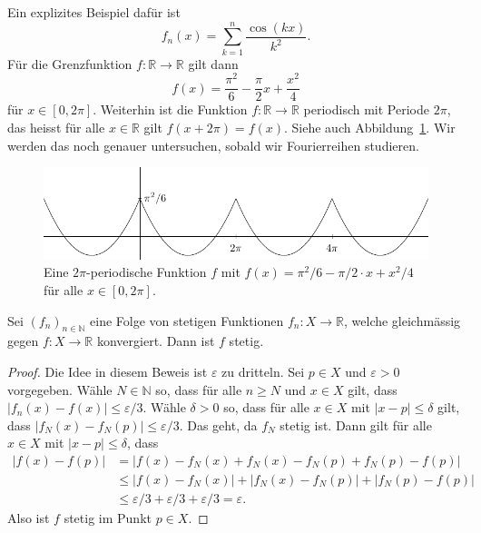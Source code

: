 \documentclass[../main.tex]{subfiles}
\begin{document}
\begin{examples}
\begin{enumerate}[(1)]
      Ein explizites Beispiel dafür ist
      \[
        f_n(x) = \sum_{k=1}^{n} \frac{\cos(kx)}{k^2}.
      \]
      Für die Grenzfunktion $f \colon\mathbb{R} \to \mathbb{R}$ gilt dann
      \[
        f(x) = \frac{\pi^2}{6} - \frac{\pi}{2}x + \frac{x^2}{4}
      \]
      für $x \in [0, 2 \pi]$. Weiterhin ist die Funktion
      $f \colon \mathbb{R} \to \mathbb{R}$ periodisch mit Periode
      $2 \pi$, das heisst für alle $x \in \mathbb{R}$ gilt $f(x + 2\pi) = f(x)$.
      Siehe auch Abbildung~\ref{fig:pi-squared-sixths}.
      Wir werden das noch genauer untersuchen, sobald wir Fourierreihen studieren.
      
      \begin{figure}[htb]
        \centering
        \includegraphics{images/pi-squared-sixths}
        \caption{Eine $2\pi$-periodische Funktion $f$
        mit $f(x) = \pi^2/6 - \pi/2 \cdot x + x^2/4$
      für alle $x \in [0, 2\pi]$.}%
        \label{fig:pi-squared-sixths}
      \end{figure}
  \end{enumerate}
\end{examples}

\begin{theorem}\label{thm:weierstrass}
  Sei ${(f_{n})}_{n \in \mathbb{N}}$ eine Folge von stetigen Funktionen
  $f_n \colon X \to \mathbb{R}$, welche gleichmässig gegen
  $f \colon X \to \mathbb{R}$ konvergiert.
  Dann ist $f$ stetig.
\end{theorem}

\begin{proof}
  Die Idee in diesem Beweis ist $\varepsilon$ zu dritteln.
  Sei $p \in X$ und $\varepsilon > 0$ vorgegeben.
  Wähle $N \in \mathbb{N}$ so, dass für alle $n \geq N$ 
  und $x \in X$ gilt, dass
  $|f_n(x) - f(x)| \leq \varepsilon /3$.
  Wähle $\delta > 0$ so, dass
  für alle $x \in X$ mit $|x - p| \leq \delta$ gilt,
  dass
  \(
    |f_N(x) - f_N(p)| \leq \varepsilon/3.
  \)
  Das geht, da $f_N$ stetig ist.
  Dann gilt für alle $x \in X$ mit $|x - p| \leq \delta$, dass
  \begin{align*}
    |f(x) - f(p)| &= |f(x) - f_N(x) + f_N(x) - f_N(p) + f_N(p) - f(p)| \\
                  & \leq |f(x)  -f_N(x)| + |f_N(x) - f_N(p)| + |f_N(p) - f(p)|\\
                  & \leq \varepsilon/3 + \varepsilon/3 + \varepsilon/3 = \varepsilon.
  \end{align*}
  Also ist $f$ stetig im Punkt $p \in X$.
\end{proof}
\end{document}
